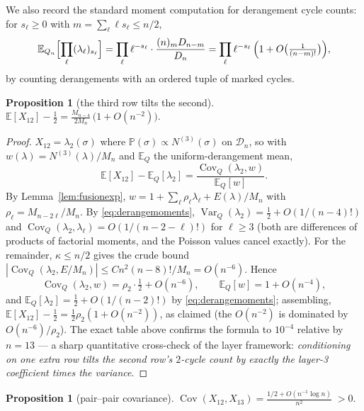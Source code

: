 \documentclass[11pt]{article}
\newtheorem{proposition}[theorem]{Proposition}
\theoremstyle{definition}
\newcommand{\E}{\mathbb{E}}
\renewcommand{\Pr}{\mathbb{P}}
\newcommand{\DD}{\mathcal{D}}
\begin{document}
We also record the standard moment computation for derangement cycle
counts: for $s_\ell\ge0$ with $m=\sum_\ell\ell s_\ell\le n/2$,
\begin{equation}\label{eq:derangemoments}
\E_{Q_n}\Bigl[\prod_\ell(\lambda_\ell)_{s_\ell}\Bigr]
=\prod_\ell\ell^{-s_\ell}\cdot\frac{(n)_m D_{n-m}}{D_n}
=\prod_\ell\ell^{-s_\ell}\,\Bigl(1+O\bigl(\tfrac1{(n-m)!}\bigr)\Bigr),
\end{equation}
by counting derangements with an ordered tuple of marked cycles.

\begin{proposition}[the third row tilts the second]\label{prop:tilt}
$\displaystyle
\E[X_{12}]-\tfrac12=\frac{M_{n-4}}{2M_n}\,\bigl(1+O(n^{-2})\bigr).$
\end{proposition}

\begin{proof}
$X_{12}=\lambda_2(\sigma)$ where $\Pr(\sigma)\propto N^{(3)}(\sigma)$ on
$\DD_n$, so with $w(\lambda)=N^{(3)}(\lambda)/M_n$ and $\E_Q$ the
uniform-derangement mean,
\[
\E[X_{12}]-\E_Q[\lambda_2]
=\frac{\operatorname{Cov}_Q(\lambda_2,w)}{\E_Q[w]} .
\]
By Lemma~\ref{lem:fusionexp}, $w=1+\sum_\ell\rho_\ell\lambda_\ell+
E(\lambda)/M_n$ with $\rho_\ell=M_{n-2\ell}/M_n$.  By
\eqref{eq:derangemoments}, $\operatorname{Var}_Q(\lambda_2)=\tfrac12+
O(1/(n-4)!)$ and $\operatorname{Cov}_Q(\lambda_2,\lambda_\ell)=
O(1/(n-2-\ell)!)$ for $\ell\ge3$ (both are differences of products of
factorial moments, and the Poisson values cancel exactly).  For the
remainder, $\kappa\le n/2$ gives the crude bound
$|\operatorname{Cov}_Q(\lambda_2,E/M_n)|\le C n^2(n-8)!/M_n=O(n^{-6})$.
Hence
\[
\operatorname{Cov}_Q(\lambda_2,w)=\rho_2\cdot\tfrac12+O(n^{-6}),
\qquad
\E_Q[w]=1+O(n^{-4}),
\]
and $\E_Q[\lambda_2]=\tfrac12+O(1/(n-2)!)$ by
\eqref{eq:derangemoments}; assembling,
$\E[X_{12}]-\tfrac12=\tfrac12\rho_2(1+O(n^{-2}))$, as claimed (the
$O(n^{-2})$ is dominated by $O(n^{-6})/\rho_2$).
The exact table above confirms the formula to $10^{-4}$ relative by
$n=13$ --- a sharp quantitative cross-check of the layer framework:
\emph{conditioning on one extra row tilts the second row's $2$-cycle
count by exactly the layer-3 coefficient times the variance}.
\end{proof}

\begin{proposition}[pair--pair covariance]\label{prop:cov}
$\displaystyle \operatorname{Cov}(X_{12},X_{13})
=\frac{1/2+O(n^{-1}\log n)}{n^{2}}\;>0 .$
\end{proposition}
\end{document}
